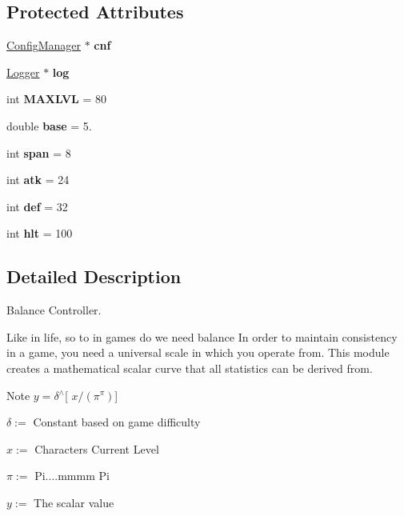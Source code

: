 \subsection*{Protected Attributes}
\begin{DoxyCompactItemize}
\item 
\mbox{\label{classBalanceController_ad0149e68d9da3d925520b69557a72dac}} 
\mbox{\hyperlink{classConfigManager}{Config\+Manager}} $\ast$ {\bfseries cnf}
\item 
\mbox{\label{classBalanceController_ae5b4a0c624a64e718ded1740bc2a15bb}} 
\mbox{\hyperlink{classLogger}{Logger}} $\ast$ {\bfseries log}
\item 
\mbox{\label{classBalanceController_ac0e90b2de8f8bc811d992834e2c07435}} 
int {\bfseries M\+A\+X\+L\+VL} = 80
\item 
\mbox{\label{classBalanceController_a7f63808b3db1ec02ad86c2289df693d0}} 
double {\bfseries base} = 5.
\item 
\mbox{\label{classBalanceController_a758f9a2858bc14a457b47cddff7731e1}} 
int {\bfseries span} = 8
\item 
\mbox{\label{classBalanceController_a94f8f130dbfc209acad2ad8075121cba}} 
int {\bfseries atk} = 24
\item 
\mbox{\label{classBalanceController_af479abd150c2c81c537734f933ba3341}} 
int {\bfseries def} = 32
\item 
\mbox{\label{classBalanceController_a1a775776fabf4916503f0ebdaeeb4234}} 
int {\bfseries hlt} = 100
\end{DoxyCompactItemize}


\subsection{Detailed Description}
Balance Controller. 

Like in life, so to in games do we need balance In order to maintain consistency in a game, you need a universal scale in which you operate from. This module creates a mathematical scalar curve that all statistics can be derived from. \begin{DoxyNote}{Note}
$y = δ$$^\wedge$\mbox{[} $x/(π^π)$\mbox{]} 

$δ :=$ Constant based on game difficulty 

$x :=$ Character\textquotesingle{}s Current Level 

$π :=$ Pi....mmmm Pi 

$y :=$ The scalar value 
\end{DoxyNote}


